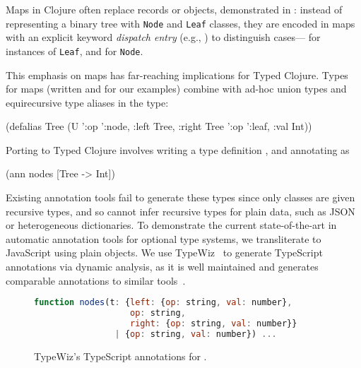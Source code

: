 Maps in Clojure often replace records or objects,
demonstrated in :
instead of representing a binary tree with \texttt{Node} and \texttt{Leaf} classes,
they are encoded in maps
with an explicit keyword \emph{dispatch entry} (e.g., ) to distinguish
cases--- for instances of \texttt{Leaf}, and
 for \texttt{Node}.

This emphasis on maps has far-reaching
implications for
Typed Clojure. %
Types for maps (written
 and
for our examples) combine with
ad-hoc union types and
equirecursive type aliases
in the type:
\begin{cljlisting}
(defalias Tree
  (U '{:op ':node, :left Tree, :right Tree}
     '{:op ':leaf, :val Int}))
\end{cljlisting}

Porting  to Typed Clojure involves writing a type definition
, and annotating  as
\begin{cljlisting}
(ann nodes [Tree -> Int])
\end{cljlisting}
Existing annotation tools fail to
generate these types since
only classes are given
recursive types,
and so cannot infer recursive types for plain data,
such as JSON or heterogeneous dictionaries.
%
To demonstrate the current state-of-the-art in automatic annotation tools for optional type systems,
we transliterate  to JavaScript using plain objects. 
We use TypeWiz~\cite{typewiz} to generate TypeScript annotations via dynamic analysis,
as it is well maintained and generates comparable annotations
to similar tools~\cite{saftoiu2010jstrace,pyannotate,typette18,An10dynamicinference,pytype,kristensen2017inference}.

\begin{figure}
\begin{lstlisting}[language=JavaScript]
function nodes(t: {left: {op: string, val: number},
                   op: string,
                   right: {op: string, val: number}}
                | {op: string, val: number}) ...
\end{lstlisting}
\caption{TypeWiz's TypeScript annotations for .}
\label{fig:infer:typewiz}
\end{figure}

